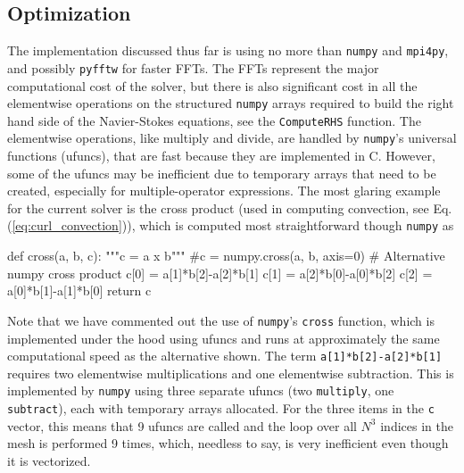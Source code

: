 \documentclass[11pt, oneside]{article}
\newcommand{\inpyth}{\lstinline[keywordstyle={}, basicstyle=\ttfamily]} %[]%
\begin{document}
\subsection{Optimization}
\label{sec:optimization}
The implementation discussed thus far is using no more than \texttt{numpy} and \texttt{mpi4py}, and possibly \texttt{pyfftw} for faster FFTs. The FFTs represent the major computational cost of the solver, but there is also significant cost in all the elementwise operations on the structured \texttt{numpy} arrays required to build the right hand side of the Navier-Stokes equations, see the \inpyth{ComputeRHS} function. The elementwise operations, like multiply and divide, are handled by \texttt{numpy}'s universal functions (ufuncs), that are fast because they are implemented in C. However, some of the ufuncs may be inefficient due to temporary arrays that need to be created, especially for multiple-operator expressions. The most glaring example for the current solver is the cross product (used in computing convection, see Eq. (\ref{eq:curl_convection})), which is computed most straightforward though \texttt{numpy} as
\begin{python}
def cross(a, b, c):
    """c = a x b"""
    #c = numpy.cross(a, b, axis=0)   # Alternative numpy cross product
    c[0] = a[1]*b[2]-a[2]*b[1]
    c[1] = a[2]*b[0]-a[0]*b[2]
    c[2] = a[0]*b[1]-a[1]*b[0]
    return c
\end{python}
Note that we have commented out the use of \texttt{numpy}'s \inpyth{cross} function, which is implemented under the hood using ufuncs and runs at approximately the same computational speed as the alternative shown. The term \inpyth{a[1]*b[2]-a[2]*b[1]} requires two elementwise multiplications and one elementwise subtraction. This is implemented by \texttt{numpy} using three separate ufuncs (two \inpyth{multiply}, one \inpyth{subtract}), each with temporary arrays allocated. For the three items in the \inpyth{c} vector, this means that 9 ufuncs are called and the loop over all $N^3$ indices in the mesh is performed 9 times, which, needless to say, is very inefficient even though it is vectorized.
\end{document}
